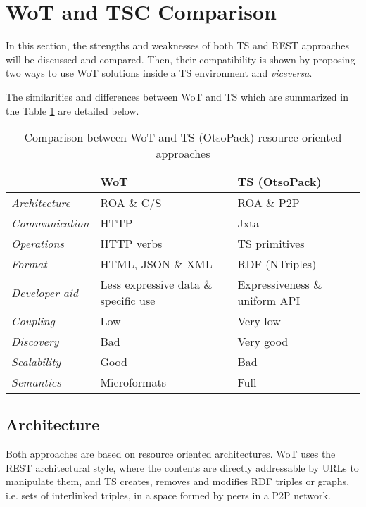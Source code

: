 \section{WoT and TSC Comparison}
\label{sec:wot_tsc_comparison}


In this section, the strengths and weaknesses of both TS and REST approaches will be discussed and compared.
Then, their compatibility is shown by proposing two ways to use WoT solutions inside a TS environment and \textit{viceversa}.

The similarities and differences between WoT and TS which are summarized in the Table \ref{tab:comparison} are detailed below.

\begin{table}[ht!]
\centering
\caption {Comparison between WoT and TS (OtsoPack) resource-oriented approaches}
\begin{tabular}{|l|p{}|p{}|}
\hline
& WoT & TS (OtsoPack) \\
\hline
\textit{Architecture} & ROA \& C/S & ROA \& P2P \\
\textit{Communication} & HTTP & Jxta \\
\textit{Operations} & HTTP verbs & TS primitives \\
\textit{Format} & HTML, JSON \& XML & RDF (NTriples) \\ %
\textit{Developer aid} & Less expressive data \& specific use & Expressiveness \& uniform API \\
\textit{Coupling} & Low & Very low \\ %
\textit{Discovery} & Bad & Very good \\
\textit{Scalability} & Good & Bad \\
\textit{Semantics} & Microformats & Full \\
\hline
\end{tabular}
\label{tab:comparison}
\end{table}

\subsection{Architecture}
Both approaches are based on resource oriented architectures. WoT uses the REST architectural style, where the contents are directly addressable by
URLs to manipulate them, and TS creates, removes and modifies RDF triples or graphs, i.e. sets of interlinked triples, in a space formed by peers
in a P2P network.

